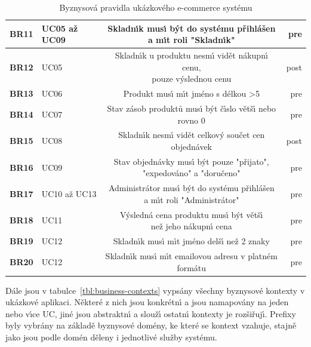 \begin{table}
\begin{tabular}{ l l c r }
        \textbf{BR11} & UC05 až UC09 & \makecell[c]{Skladn\'{\i}k mus\'{\i} b\'yt do systému přihlášen \\ a m\'{\i}t roli "Skladn\'{\i}k"} & pre \\ \hline
        \textbf{BR12} & UC05 & \makecell[c]{Skladn\'{\i}k u produktu nesm\'{\i} vidět nákupn\'{\i} cenu, \\ pouze v\'yslednou cenu} & post \\ \hline
        \textbf{BR13} & UC06 & Produkt mus\'{\i} m\'{\i}t jméno s délkou >5 & pre \\ \hline
        \textbf{BR14} & UC07 & Stav zásob produktů mus\'{\i} b\'yt č\'{\i}slo větš\'{\i} nebo rovno 0 & pre \\ \hline
        \textbf{BR15} & UC08 & Skladn\'{\i}k nesm\'{\i} vidět celkov\'y součet cen objednávek & post \\ \hline
        \textbf{BR16} & UC09 & \makecell[c]{Stav objednávky mus\'{\i} b\'yt pouze "přijato", \\ "expedováno" a "doručeno"} & pre \\ \hline
        \textbf{BR17} & UC10 až UC13 & \makecell[c]{Administrátor mus\'{\i} b\'yt do systému přihlášen \\ a m\'{\i}t roli "Administrátor"} & pre \\ \hline
        \textbf{BR18} & UC11 & \makecell[c]{V\'ysledná cena produktu mus\'{\i} b\'yt větš\'{\i} \\ než jeho nákupn\'{\i} cena} & pre \\ \hline
        \textbf{BR19} & UC12 & Skladn\'{\i}k mus\'{\i} m\'{\i}t jméno delš\'{\i} než 2 znaky & pre \\ \hline
        \textbf{BR20} & UC12 & Skladn\'{\i}k mus\'{\i} m\'{\i}t emailovou adresu v platném formátu & pre \\
        \hline
    \end{tabular}
    \caption{Byznysová pravidla ukázkového e-commerce systému}
    \label{tbl:business-rules}
\end{table}

Dále jsou v tabulce~\ref{tbl:business-contexts} vypsány všechny byznysové kontexty v ukázkové aplikaci.
Některé z nich jsou konkrétn\'{\i} a jsou namapovány na jeden nebo v\'{\i}ce \gls{UC},
jiné jsou abstraktn\'{\i} a slouž\'{\i} ostatn\'{\i} kontexty je rozšiřuj\'{\i}.
Prefixy byly vybrány na základě byznysové domény, ke které se kontext vzahuje, stajně jako
jsou podle domén děleny i jednotlivé služby systému.

